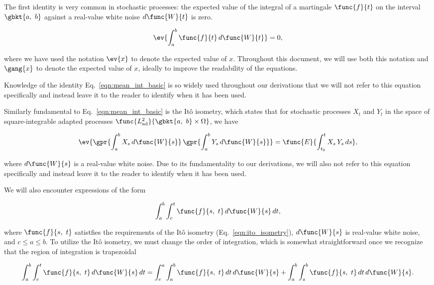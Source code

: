 The first identity is very common in stochastic processes: the expected value of the integral of a martingale $\func{f}{t}$ on the interval $\gbkt{a,\ b}$ against a real-value white noise $d\func{W}{t}$ is zero.

\begin{equation}
	\ev{\int_{a}^{b} \func{f}{t}\,d\func{W}{t}} = 0,
	\label{eqn:mean_int_basic}
\end{equation}

where we have used the notation $\ev{x}$ to denote the expected value of $x$. Throughout this document, we will use both this notation and $\gang{x}$ to denote the expected value of $x$, ideally to improve the readability of the equations. 

Knowledge of the identity Eq.~\ref{eqn:mean_int_basic} is so widely used throughout our derivations that we will not refer to this equation specifically and instead leave it to the reader to identify when it has been used.

Similarly fundamental to Eq.~\ref{eqn:mean_int_basic} is the It\^{o} isometry, which states that for stochastic processes $X_t$ and $Y_t$ in the space of square-integrable adapted processes $\func{L^2_{\text{ad}}}{\gbkt{a,\ b} \times \Omega}$, we have

\begin{equation}
	\ev{\gpr{\int_{a}^{b} X_s\,d\func{W}{s}}\,\gpr{\int_{a}^{b} Y_s\,d\func{W}{s}}} = \func{E}{\int_{t_0}^{t} X_s\,Y_s\,ds},
	\label{eqn:ito_isometry}
\end{equation}

where $d\func{W}{s}$ is a real-value white noise. Due to its fundamentality to our derivations, we will also not refer to this equation specifically and instead leave it to the reader to identify when it has been used.

We will also encounter expressions of the form

$$ \int_{a}^{b} \int_{c}^{t} \func{f}{s,\ t}\,d\func{W}{s}\,dt, $$

where $\func{f}{s,\ t}$ satistfies the requirements of the It\^{o} isometry (Eq.~\ref{eqn:ito_isometry}), $d\func{W}{s}$ is real-value white noise, and $c \leq a \leq b$. To utilize the It\^{o} isometry, we must change the order of integration, which is somewhat straightforward once we recognize that the region of integration is trapezoidal

\begin{equation}
	\int_{a}^{b} \int_{c}^{t} \func{f}{s,\ t}\,d\func{W}{s}\,dt = \int_{c}^{a} \int_{a}^{b} \func{f}{s,\ t}\,dt\,d\func{W}{s} + \int_{a}^{b} \int_{s}^{b} \func{f}{s,\ t}\,dt\,d\func{W}{s}.
	\label{eqn:dbl_int_ito}
\end{equation}

